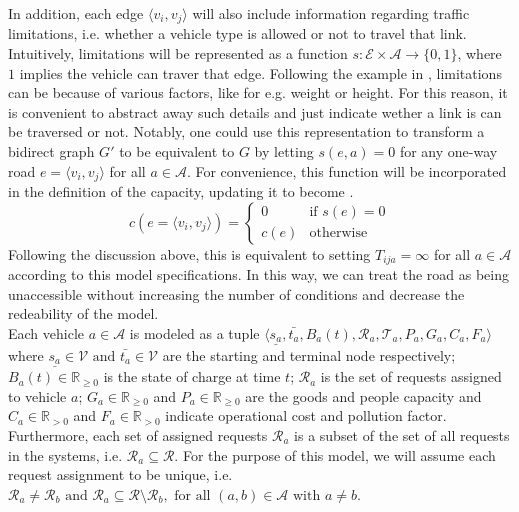 In addition, each edge $\langle v_i, v_j \rangle$ will also include information regarding traffic limitations, i.e. whether a vehicle type is allowed or not to travel that link. Intuitively, limitations will be represented as a function $s: \mathcal{E} \times \mathcal{A} \rightarrow\{0,1\}$, where $1$ implies the vehicle can traver that edge. Following the example in \cite{project_thesis}, limitations can be because of various factors, like for e.g. weight or height. For this reason, it is convenient to abstract away such details and just indicate wether a link is can be traversed or not. Notably, one could use this representation to transform a bidirect graph $G'$ to be equivalent to $G$ by letting $s(e,a) = 0$ for any one-way road $e = \langle v_i, v_j \rangle$ for all $a \in \mathcal{A}$. For convenience, this function will be incorporated in the definition of the capacity, updating it to become . 
\begin{equation}
	c(e = \langle v_i, v_j \rangle) = 
	\begin{cases}
		0 & \text{if } s(e) = 0 \\
		c(e) & \text{otherwise}
	\end{cases}
	\label{eq:capacity}
\end{equation}
Following the discussion above, this is equivalent to setting $T_{ija} = \infty$ for all $a \in \mathcal{A}$ according to this model specifications. In this way, we can treat the road as being unaccessible without increasing the number of conditions and decrease the redeability of the model. \\
Each vehicle $a\in \mathcal{A}$ is modeled as a tuple $\langle \underline{s_a},\bar{t_a}, B_a(t),\mathcal{R}_a, \mathcal{T}_a, P_a, G_a, C_a, F_a  \rangle$ where $\underline{s_a}\in \mathcal{V} \text{ and } \bar{t_a}\in \mathcal{V}$ are the starting and terminal node respectively; $B_a(t)\in \mathbb{R}_{\ge0}$ is the state of charge at time $t$; $\mathcal{R}_a$ is the set of requests assigned to vehicle $a$; $G_a \in \mathbb{R}_{\ge0}$ and $P_a \in \mathbb{R}_{\ge0}$ are the goods and people capacity and $C_a \in \mathbb{R}_{>0}$ and $F_a \in \mathbb{R}_{>0}$ indicate operational cost and pollution factor. Furthermore, each set of assigned requests $\mathcal{R}_a$ is a subset of the set of all requests in the systems, i.e. $\mathcal{R}_a \subseteq\mathcal{R}$. For the purpose of this model, we will assume each request assignment to be unique, i.e. $\mathcal{R}_a \neq \mathcal{R}_b \text{ and } \mathcal{R}_a \subseteq \mathcal{R} \setminus \mathcal{R}_b,  \text{ for all } (a,b) \in \mathcal{A} \text{ with } a\neq b$. \\
